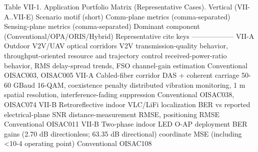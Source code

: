 {}Table VII-1. Application Portfolio Matrix (Representative Cases).\markdownRendererParagraphSeparator
{}\markdownRendererPipe{} Vertical (VII-A..VII-E) \markdownRendererPipe{} Scenario motif (short) \markdownRendererPipe{} Comm-plane metrics (comma-separated) \markdownRendererPipe{} Sensing-plane metrics (comma-separated) \markdownRendererPipe{} Dominant component (Conventional/OPA/ORIS/Hybrid) \markdownRendererPipe{} Representative cite keys \markdownRendererPipe{}\markdownRendererSoftLineBreak
{}\markdownRendererPipe{}---\markdownRendererPipe{}---\markdownRendererPipe{}---\markdownRendererPipe{}---\markdownRendererPipe{}---\markdownRendererPipe{}---\markdownRendererPipe{}\markdownRendererSoftLineBreak
{}\markdownRendererPipe{} VII-A \markdownRendererPipe{} Outdoor V2V/UAV optical corridors \markdownRendererPipe{} V2V transmission-quality behavior, throughput-oriented resource and trajectory control \markdownRendererPipe{} received-power-ratio behavior, RMS delay-spread trends, FSO channel-gain estimation \markdownRendererPipe{} Conventional \markdownRendererPipe{} O\markdownRendererUnderscore{}ISAC\markdownRendererUnderscore{}003, O\markdownRendererUnderscore{}ISAC\markdownRendererUnderscore{}005 \markdownRendererPipe{}\markdownRendererSoftLineBreak
{}\markdownRendererPipe{} VII-A \markdownRendererPipe{} Cabled-fiber corridor DAS + coherent carriage \markdownRendererPipe{} 50-60 GBaud 16-QAM, coexistence penalty \markdownRendererPipe{} distributed vibration monitoring, 1 m spatial resolution, interference-fading suppression \markdownRendererPipe{} Conventional \markdownRendererPipe{} O\markdownRendererUnderscore{}ISAC\markdownRendererUnderscore{}038, O\markdownRendererUnderscore{}ISAC\markdownRendererUnderscore{}074 \markdownRendererPipe{}\markdownRendererSoftLineBreak
{}\markdownRendererPipe{} VII-B \markdownRendererPipe{} Retroreflective indoor VLC/LiFi localization \markdownRendererPipe{} BER vs reported electrical-plane SNR \markdownRendererPipe{} distance-measurement RMSE, positioning RMSE \markdownRendererPipe{} Conventional \markdownRendererPipe{} O\markdownRendererUnderscore{}ISAC\markdownRendererUnderscore{}011 \markdownRendererPipe{}\markdownRendererSoftLineBreak
{}\markdownRendererPipe{} VII-B \markdownRendererPipe{} Two-phase indoor LED O-AP deployment \markdownRendererPipe{} BER gains (2.70 dB directionless; 63.35 dB directional) \markdownRendererPipe{} coordinate MSE (including <10\markdownRendererCircumflex{}-4 operating point) \markdownRendererPipe{} Conventional \markdownRendererPipe{} O\markdownRendererUnderscore{}ISAC\markdownRendererUnderscore{}108 \markdownRendererPipe{}\markdownRendererSoftLineBreak
